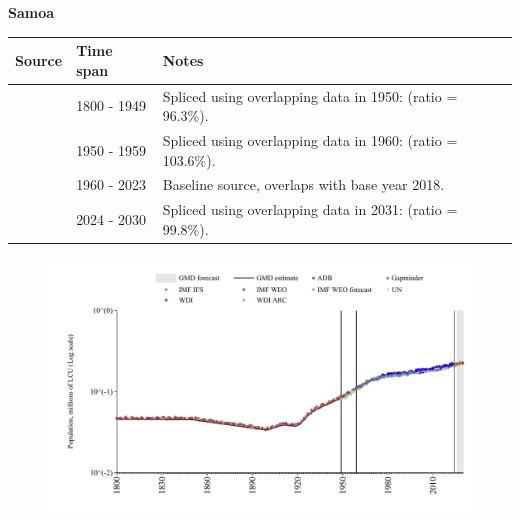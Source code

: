 \documentclass[12pt,a4paper,landscape]{article}
\begin{document}
\begin{adjustbox}{max totalsize={\paperwidth}{\paperheight},center}
\begin{minipage}[t][\textheight][t]{\textwidth}
\vspace*{0.5cm}
{}
\begin{center}
{\Large\bfseries Samoa}
\end{center}
\vspace{0.5cm}
\begin{table}[H]
\centering
\small
\begin{tabular}{|l|l|l|}
\hline
\textbf{Source} & \textbf{Time span} & \textbf{Notes} \\
\hline
\rowcolor{white}\cite{Gapminder}& 1800 - 1949 &Spliced using overlapping data in 1950: (ratio = 96.3\%).\\
\rowcolor{lightgray}\cite{IMF_IFS}& 1950 - 1959 &Spliced using overlapping data in 1960: (ratio = 103.6\%).\\
\rowcolor{white}\cite{WDI}& 1960 - 2023 &Baseline source, overlaps with base year 2018.\\
\rowcolor{lightgray}\cite{Gapminder}& 2024 - 2030 &Spliced using overlapping data in 2031: (ratio = 99.8\%).\\
\hline
\end{tabular}
\end{table}
\begin{figure}[H]
\centering
\includegraphics[width=\textwidth,height=0.6\textheight,keepaspectratio]{graphs/WSM_pop.pdf}
\end{figure}
\end{minipage}
\end{adjustbox}
\end{document}
